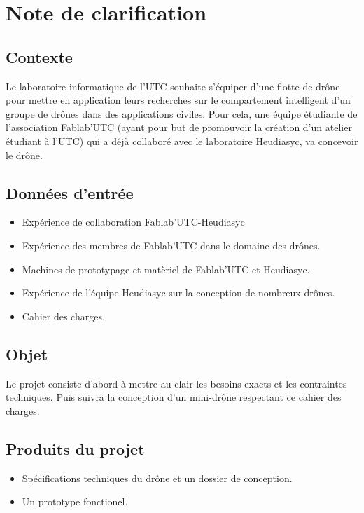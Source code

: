 \documentclass[a4paper, 12pt, leqno]{report}
\theoremstyle{plain}
\begin{document}
        \chapter{Note de clarification}
        \section{Contexte}  
        Le laboratoire informatique de l'UTC souhaite s'équiper d'une flotte de drône pour mettre en application leurs recherches sur le compartement intelligent d'un groupe de drônes dans des applications civiles. Pour cela, une équipe étudiante de l'association Fablab'UTC (ayant pour but de promouvoir la création d'un atelier étudiant à l'UTC) qui a déjà collaboré avec le laboratoire Heudiasyc, va concevoir le drône.
        \section{Données d'entrée}
        \begin{itemize}
        \item Expérience de collaboration Fablab'UTC-Heudiasyc
        \item Expérience des membres de Fablab'UTC dans le domaine des drônes.
        \item Machines de prototypage et matèriel de Fablab'UTC et Heudiasyc.
        \item Expérience de l'équipe Heudiasyc sur la conception de nombreux drônes.
        \item Cahier des charges.
        \end{itemize}
         
        \section{Objet}
        Le projet consiste d'abord à mettre au clair les besoins exacts et les contraintes techniques. Puis suivra la conception d'un mini-drône respectant ce cahier des charges.
        \section{Produits du projet}
        \begin{itemize}
        \item Spécifications techniques du drône et un dossier de conception.
        \item Un prototype fonctionel.
        \end{itemize}
        
\end{document}
